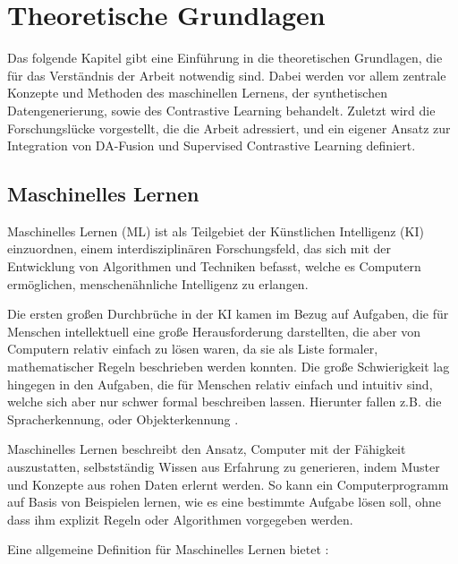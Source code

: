 \chapter{Theoretische Grundlagen}

Das folgende Kapitel gibt eine Einführung in die theoretischen Grundlagen, die für das Verständnis der Arbeit notwendig sind. Dabei werden vor allem zentrale Konzepte und Methoden des maschinellen Lernens, der synthetischen Datengenerierung, sowie des Contrastive Learning behandelt. Zuletzt wird die Forschungslücke vorgestellt, die die Arbeit adressiert, und ein eigener Ansatz zur Integration von DA-Fusion und Supervised Contrastive Learning definiert.

\section{Maschinelles Lernen} \label{sec:ml}

Maschinelles Lernen (ML) ist als Teilgebiet der Künstlichen Intelligenz (KI) einzuordnen, einem interdisziplinären Forschungsfeld, das sich mit der Entwicklung von Algorithmen und Techniken befasst, welche es Computern ermöglichen, menschenähnliche Intelligenz zu erlangen.

Die ersten großen Durchbrüche in der KI kamen im Bezug auf Aufgaben, die für Menschen intellektuell eine große Herausforderung darstellten, die aber von Computern relativ einfach zu lösen waren, da sie als Liste formaler, mathematischer Regeln beschrieben werden konnten. Die große Schwierigkeit lag hingegen in den Aufgaben, die für Menschen relativ einfach und intuitiv sind, welche sich aber nur schwer formal beschreiben lassen. Hierunter fallen z.B. die Spracherkennung, oder Objekterkennung \parencite{Goodfellow2016deeplearning}.

Maschinelles Lernen beschreibt den Ansatz, Computer mit der Fähigkeit auszustatten, selbstständig Wissen aus Erfahrung zu generieren, indem Muster und Konzepte aus rohen Daten erlernt werden. So kann ein Computerprogramm auf Basis von Beispielen lernen, wie es eine bestimmte Aufgabe lösen soll, ohne dass ihm explizit Regeln oder Algorithmen vorgegeben werden.

Eine allgemeine Definition für Maschinelles Lernen bietet \parencite{Mitchell1997machinelearning}:

